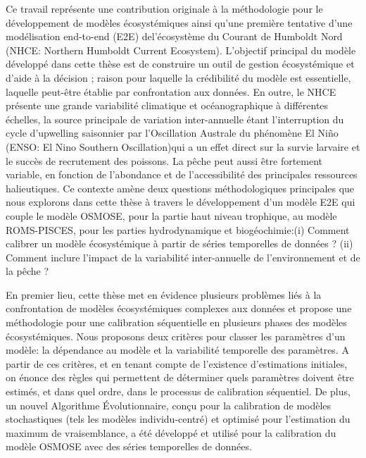 Ce travail représente une contribution originale à la méthodologie pour le dé\-ve\-lo\-ppe\-ment de modèles écosystémiques ainsi qu'une première tentative d'une modélisation end-to-end (E2E) del'écosystème du Courant de Humboldt Nord (NHCE: Northern Humboldt Current Ecosystem). L'objectif principal du modèle développé dans cette thèse est de construire un outil de gestion écosystémique et d'aide à la décision ; raison pour laquelle la crédibilité du modèle est essentielle, laquelle peut-être établie par confrontation aux données. En outre, le NHCE présente une grande variabilité climatique et océanographique à différentes échelles, la source principale de variation inter-annuelle étant l'interruption du cycle d'upwelling saisonnier par l'Oscillation Australe du phénomène El Niño (ENSO: El Nino Southern Oscillation)qui a un effet direct sur la survie larvaire et le succès de recrutement des poissons. La pêche peut aussi être fortement variable, en fonction de l'abondance et de l'accessibilité des principales ressources halieutiques. Ce contexte amène deux questions méthodologiques principales que nous explorons dans cette thèse à travers le dévelo\-ppe\-ment d'un modèle E2E qui couple le modèle OSMOSE, pour la partie haut niveau trophique, au modèle ROMS-PISCES, pour les parties hydrodynamique et biogéochimie:(i) Comment calibrer un modèle écosystémique à partir de séries temporelles de données ? (ii) Comment inclure l'impact de la variabilité inter-annuelle de l'environnement et de la pêche ?


En premier lieu, cette thèse met en évidence plusieurs problèmes liés à la confrontation de modèles écosystémiques complexes aux données et propose une mé\-tho\-do\-lo\-gie pour une calibration séquentielle en plusieurs phases des modèles éco\-sys\-té\-mi\-ques. Nous proposons deux critères pour classer les paramètres d'un modèle: la dépendance au modèle et la variabilité temporelle des paramètres. A partir de ces critères, et en tenant compte de l'existence d'estimations initiales, on énonce des règles qui permettent de déterminer quels paramètres doivent être estimés, et dans quel ordre, dans le processus de calibration séquentiel. De plus, un nouvel Algorithme Évolutionnaire, conçu pour la calibration de modèles stochastiques (tels les modèles individu-centré) et optimisé pour l'estimation du maximum de vraisemblance, a été développé et utilisé pour la calibration du modèle OSMOSE avec des séries temporelles de données.


